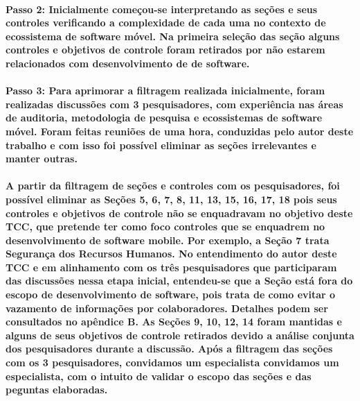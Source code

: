  \noindent \paragraph{\textbf{Passo 2:} Inicialmente começou-se interpretando as seções e seus controles verificando a complexidade de cada uma no contexto de ecossistema de software móvel. Na primeira seleção das seção alguns controles e objetivos de controle foram retirados por não estarem relacionados com desenvolvimento de de software.}
 
 \noindent 
    \paragraph{
    \textbf{Passo 3:} Para aprimorar a filtragem realizada inicialmente, foram realizadas discussões com 3 pesquisadores, com experiência nas áreas de auditoria, metodologia de pesquisa e ecossistemas de software móvel. Foram feitas reuniões de uma hora, conduzidas pelo autor deste trabalho e com isso foi possível eliminar as seções irrelevantes e manter outras.
    }
 
    \paragraph{
  A partir da filtragem de seções e controles com os pesquisadores, foi possível eliminar as Seções 5, 6, 7, 8, 11, 13, 15, 16, 17, 18 pois seus controles e objetivos de controle não se enquadravam no objetivo deste TCC, que  pretende ter como foco controles que se enquadrem no desenvolvimento de software mobile. Por exemplo, a Seção 7 trata Segurança dos Recursos Humanos. No entendimento do autor deste TCC e em alinhamento com os três pesquisadores que participaram das discussões nessa etapa inicial, entendeu-se que a Seção está fora do escopo de desenvolvimento de software, pois trata de como evitar o vazamento de informações por colaboradores. Detalhes podem ser consultados no apêndice B. As Seções 9, 10, 12, 14 foram mantidas e alguns de seus objetivos de controle retirados devido a análise conjunta dos pesquisadores durante a discussão. Após a filtragem das seções com os 3 pesquisadores, convidamos um especialista convidamos um especialista, com o intuito de validar o escopo das seções e das peguntas elaboradas. 
    }
    
  \noindent
